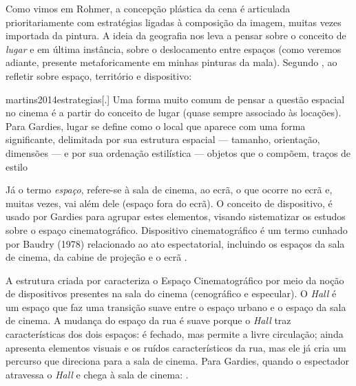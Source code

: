 Como vimos em Rohmer, a concepção plástica da cena é articulada
prioritariamente com estratégias ligadas à composição da imagem, muitas
vezes importada da pintura. A ideia da geografia nos leva a pensar
sobre o conceito de \emph{lugar} e em última instância, sobre o
deslocamento entre espaços (como veremos adiante, presente
metaforicamente em minhas pinturas da mala). Segundo
\textcite{martins2014estrategias}, ao refletir sobre espaço, território
e dispositivo:

\begin{displaycquote}[9]{martins2014estrategias}[.]
	Uma forma muito comum de pensar a questão espacial no cinema é a partir
	do conceito de lugar (quase sempre associado às locações). Para Gardies,
	lugar se define como o local que aparece com uma forma significante,
	delimitada por sua estrutura espacial --- tamanho, orientação, dimensões
	--- e por sua ordenação estilística --- objetos que o compõem, traços de
	estilo
\end{displaycquote}

Já o termo \emph{espaço}, refere-se à sala de cinema, ao ecrã, o que
ocorre no ecrã e, muitas vezes, vai além dele (espaço fora do ecrã). O
conceito de dispositivo, é usado por Gardies para agrupar estes
elementos, visando sistematizar os estudos sobre o espaço
cinematográfico. Dispositivo cinematográfico é um termo cunhado por
Baudry (1978) relacionado ao ato espectatorial, incluindo os espaços da
sala de cinema, da cabine de projeção e o ecrã \parencite{martins2014estrategias}.

A estrutura criada por \textcite{gardies2019espaco} caracteriza
o Espaço Cinematográfico por meio da noção de dispositivos presentes na
sala do cinema (cenográfico e especular). O \emph{Hall} é um espaço que
faz uma transição suave entre o espaço urbano e o espaço da sala de
cinema. A mudança do espaço da rua é suave porque o \emph{Hall} traz
características dos dois espaços: é fechado, mas permite a livre
circulação; ainda apresenta elementos visuais e os ruídos
característicos da rua, mas ele já cria um percurso que direciona para
a sala de cinema. Para Gardies, quando o espectador atravessa o
\emph{Hall} e chega à sala de cinema: .

